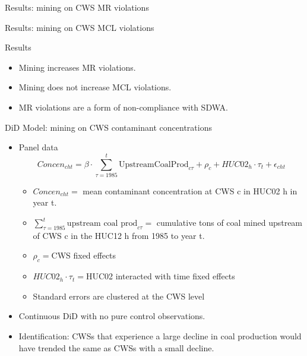 \documentclass{beamer}
\begin{document}
\begin{frame}{Results: mining on CWS MR violations}

\end{frame}

\begin{frame}{Results: mining on CWS MCL violations}

\end{frame}

\begin{frame}{Results}
\begin{itemize}
    \item Mining increases MR violations.
    \item Mining does not increase MCL violations.
    \item MR violations are a form of non-compliance with SDWA.
\end{itemize}
\end{frame}

\begin{frame}{DiD Model: mining on CWS contaminant concentrations}
\begin{itemize}
    \item Panel data
    \begin{equation}\label{eq:huc02reg}
    \textit{Concen}_{cht}= \beta\cdot\sum_{\tau=1985}^t\text{UpstreamCoalProd}_{c\tau}  + \rho_c + HUC02_h\cdot\tau_t + \epsilon_{cht}
\end{equation}

    \begin{itemize}
        \item $\textit{Concen}_{cht}=$ mean contaminant concentration at CWS c in HUC02 h in year t.
        \item $\sum_{\tau=1985}^t\text{upstream coal prod}_{c\tau}=$ cumulative tons of coal mined upstream of CWS c in the HUC12 h from 1985 to year t.
        \item $\rho_c=$CWS fixed effects
        \item $HUC02_h\cdot\tau_t=$HUC02 interacted with time fixed effects
        \item Standard errors are clustered at the CWS level
    \end{itemize}
    \item Continuous DiD with no pure control observations. 
    \item Identification: CWSs that experience a large decline in coal production would have trended the same as CWSs with a small decline.
\end{itemize}
\end{frame}
\end{document}
